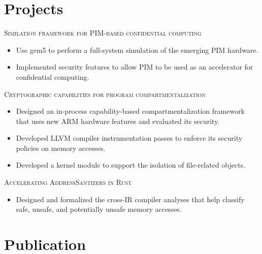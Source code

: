 \documentclass[a4paper,12pt]{article}
\begin{document}
\section{Projects}

\textsc{Similation framework for PIM-based confidential computing}
\begin{itemize}[nosep,after=\strut, leftmargin=2em, itemsep=3pt]
    \item Use gem5 to perform a full-system simulation of the emerging PIM hardware.
    \item Implemented security features to allow PIM to be used as an accelerator for confidential computing.
\end{itemize}

\textsc{Cryptographic capabilities for program compartmentalization}
\begin{itemize}[nosep,after=\strut, leftmargin=2em, itemsep=3pt]
    \item Designed an in-process capability-based compartmentalization framework that uses new ARM hardware features and evaluated its security.
    \item Developed LLVM compiler instrumentation passes to enforce its security policies on memory accesses.
    \item Developed a kernel module to support the isolation of file-related objects.
\end{itemize}

\textsc{Accelerating AddressSantizers in Rust}
\begin{itemize}[nosep,after=\strut, leftmargin=2em, itemsep=3pt]
    \item Designed and formalized the cross-IR compiler analyses that help classify safe, unsafe, and potentially unsafe memory accesses. 
\end{itemize}






\newpage
\section{Publication}
\begin{refsection}
\nocite{*}
\printbibliography[heading=none]
\end{refsection}
\vfill
{}
\end{document}
